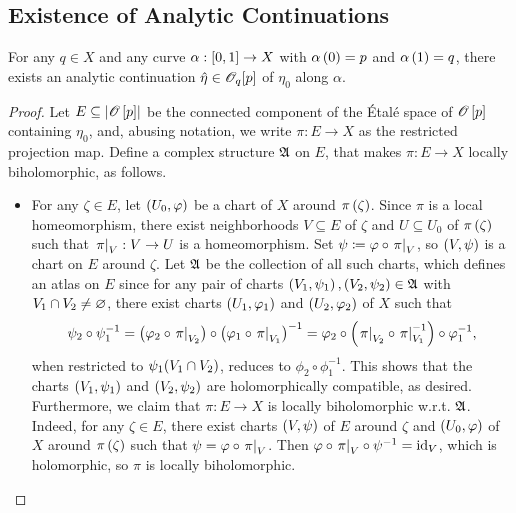\documentclass[../Moduli_Spaces_of_Riemann_Surfaces.tex]{subfiles}
\begin{document}
    \subsection{Existence of Analytic Continuations}
    \begin{theorem}
        For any $q\in X$ and any curve $\alpha:\l[0,1\r]\to X$ with $\alpha\l(0\r)=p$ and $\alpha\l(1\r)=q$, there exists an analytic continuation $\hat{\eta}\in\HOLO_q\!\l[p\r]$ of $\eta_0$ along $\alpha$.
    \end{theorem}
    \begin{proof}
        Let $E\subseteq\l|\HOLO\l[p\r]\r|$ be the connected component of the Étalé space of $\HOLO\l[p\r]$ containing $\eta_0$, and, abusing notation, we write $\pi:E\to X$ as the restricted projection map. Define a complex structure $\mf{A}$ on $E$, that makes $\pi:E\to X$ locally biholomorphic, as follows.
        \begin{itemize}
            \item For any $\zeta\in E$, let $\tpl{U_0,\phi}$ be a chart of $X$ around $\pi\l(\zeta\r)$. Since $\pi$ is a local homeomorphism, there exist neighborhoods $V\subseteq E$ of $\zeta$ and $U\subseteq U_0$ of $\pi\l(\zeta\r)$ such that $\l.\pi\r|_V:V\to U$ is a homeomorphism. Set $\psi\coloneqq\phi\circ\l.\pi\r|_V$, so $\tpl{V,\psi}$ is a chart on $E$ around $\zeta$. Let $\mf{A}$ be the collection of all such charts, which defines an atlas on $E$ since for any pair of charts $\tpl{V_1,\psi_1},\tpl{V_2,\psi_2}\in\mf{A}$ with $V_1\cap V_2\neq\em$, there exist charts $\tpl{U_1,\phi_1}$ and $\tpl{U_2,\phi_2}$ of $X$ such that
                \begin{equation*}
                    \psi_2\circ\psi_1^{-1}=\l(\phi_2\circ\l.\pi\r|_{V_2}\r)\circ\l(\phi_1\circ\l.\pi\r|_{V_1}\r)^{-1}=\phi_2\circ\l(\l.\pi\r|_{V_2}\circ\l.\pi\r|_{V_1}^{-1}\r)\circ\phi_1^{-1},
                \end{equation*}
                when restricted to $\psi_1\!\l(V_1\cap V_2\r)$, reduces to $\phi_2\circ\phi_1^{-1}$. This shows that the charts $\tpl{V_1,\psi_1}$ and $\tpl{V_2,\psi_2}$ are holomorphically compatible, as desired. Furthermore, we claim that $\pi:E\to X$ is locally biholomorphic w.r.t. $\mf{A}$. Indeed, for any $\zeta\in E$, there exist charts $\tpl{V,\psi}$ of $E$ around $\zeta$ and $\tpl{U_0,\phi}$ of $X$ around $\pi\l(\zeta\r)$ such that $\psi=\phi\circ\l.\pi\r|_V$. Then $\phi\circ\l.\pi\r|_V\circ\psi^{-1}=\id_V$, which is holomorphic, so $\pi$ is locally biholomorphic.
        \end{itemize}

\end{proof}
\end{document}
